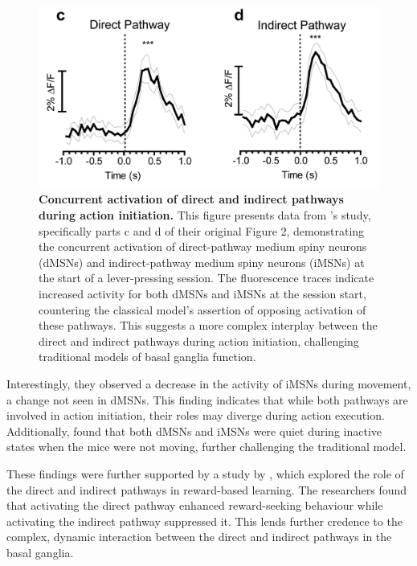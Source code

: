 \documentclass[10pt]{article}
\begin{document}
\begin{sloppypar}
  \begin{figure}[ht]
    \centering
    \includegraphics[width=\textwidth]{figures/direct-indirect-activation.png}
    \caption[Concurrent activation of direct and indirect pathways during action initiation]{\textbf{Concurrent activation of direct and indirect pathways during action initiation.} This figure presents data from \cite{cui_concurrent_2013} ’s study, specifically parts c and d of their original Figure 2, demonstrating the concurrent activation of direct-pathway medium spiny neurons (dMSNs) and indirect-pathway medium spiny neurons (iMSNs) at the start of a lever-pressing session. The fluorescence traces indicate increased activity for both dMSNs and iMSNs at the session start, countering the classical model’s assertion of opposing activation of these pathways. This suggests a more complex interplay between the direct and indirect pathways during action initiation, challenging traditional models of basal ganglia function.}
    \label{fig:pathway-activation}
  \end{figure}

  Interestingly, they observed a decrease in the activity of iMSNs during movement, a change not seen in dMSNs. This finding indicates that while both pathways are involved in action initiation, their roles may diverge during action execution. Additionally, \cite{cui_concurrent_2013} found that both dMSNs and iMSNs were quiet during inactive states when the mice were not moving, further challenging the traditional model.

  These findings were further supported by a study by \cite{guillaumin_experimental_2021}, which explored the role of the direct and indirect pathways in reward-based learning. The researchers found that activating the direct pathway enhanced reward-seeking behaviour while activating the indirect pathway suppressed it. This lends further credence to the complex, dynamic interaction between the direct and indirect pathways in the basal ganglia.


\end{sloppypar}
\end{document}
